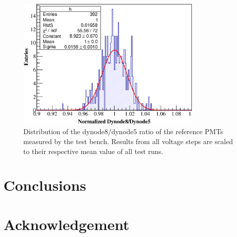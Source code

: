 \documentclass[5p, times]{elsarticle}
\begin{document}
\begin{figure}[h!]
 \centering
 \includegraphics[width=90mm]{RefDy58Dist}
\caption{Distribution of the dynode8/dynode5 ratio of the reference PMTs measured by the test bench.
Results from all voltage steps are scaled to their respective mean value of all test runs.}
\label{fig:dy58_stabiltiy}
\end{figure} 

\section{Conclusions}
\label{sec:conclustions}

\section*{Acknowledgement}
\end{document}
